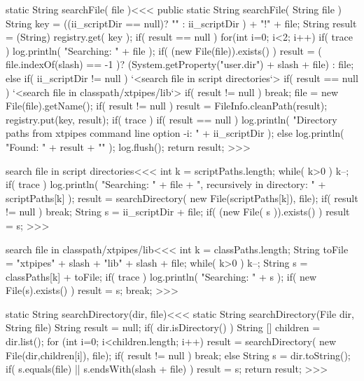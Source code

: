 \documentclass{article}
\begin{document}
\<static String searchFile( file )\><<<
public static String searchFile( String file ){
   String key = ((ii_scriptDir == null)? "" : ii_scriptDir )
                + "!" + file;
   String result = (String) registry.get( key );
   if( result == null ){
      for(int i=0; i<2; i++){
         if( trace ){
            log.println( "Searching: " + file );
         }
         if( (new File(file)).exists() ){
            result = ( file.indexOf(slash) == -1 )?
                         (System.getProperty("user.dir") + slash + file)
                        :
                         file;
         }
         else {
            if( ii_scriptDir != null ){
               `<search file in script directories`>
            }
            if( result == null ){
               `<search file in classpath/xtpipes/lib`>
         }  }
         if( result != null ){ break; }
         file =  new File(file).getName();
      }
      if( result != null ){
        result = FileInfo.cleanPath(result);
        registry.put(key, result);
      }
   }
   if( trace ){
      if( result == null ){
         log.println(
            "Directory paths from xtpipes command line option -i: "
                                            + ii_scriptDir );
      } else { log.println( "Found: " + result + "\n" ); }
      log.flush();
   }
   return result;
}
>>>



\<search file in script directories\><<<
int k = scriptPaths.length;
while( k>0 ){
  k--;
  if( trace ){
    log.println( "Searching: " + file
                   + ", recursively in directory: " + scriptPaths[k] );
  }
  result = searchDirectory( new File(scriptPaths[k]), file);
  if( result != null ){ break; }
}
String s = ii_scriptDir + file;
if( (new File( s )).exists() ){ result = s; }
>>>


\<search file in classpath/xtpipes/lib\><<<
int k = classPaths.length;
String toFile = "xtpipes" + slash + "lib" + slash + file;
while( k>0 ){
  k--;
  String s =  classPaths[k] + toFile;
  if( trace ){ log.println( "Searching: " + s ); }
  if( new File(s).exists() ){ result = s; break; }
}
>>>


\<static String searchDirectory(dir, file)\><<<
static String searchDirectory(File dir, String file) {
    String result = null;
    if( dir.isDirectory() ){
       String [] children = dir.list();
       for (int i=0; i<children.length; i++) {
          result = searchDirectory( new File(dir,children[i]), file);
          if( result != null ) { break; }
       }
    } else {
       String s = dir.toString();
       if( s.equals(file) || s.endsWith(slash + file) ){
           result = s;
        }
     }
     return result;
}
>>>
\end{document}
